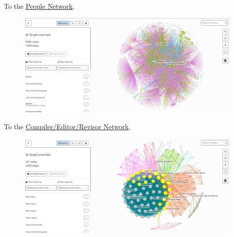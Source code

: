 \documentclass[12pt,a4paper,oneside]{book}
\begin{document}
\begin{sloppypar}
To the \href{https://ouestware.gitlab.io/retina/1.0.0-beta.1/#/graph/?url=https%3A%2F%2Fgist.githubusercontent.com%2Fdodopianist%2F284997da5801f90b7767df40eef365b0%2Fraw%2Ff300443ab5160ab340f1472c63a4edd270ea1c05%2Fpeople_network.gexf&sa[]=ei&sa[]=be&sa[]=clo&sa[]=deg-n&sa[]=clu-n&ca[]=gn&ca[]=msr&ca[]=msl&ca[]=msp&ca[]=md-s&ca[]=bip&ca[]=bir&ca[]=deap&ca[]=dear&ca[]=pri&ca[]=hoo&ca[]=clo&ca[]=be&ca[]=deg-n&ca[]=clu-n&ec=o}{\underline{People Network}}.
\begin{figure}[H]
\centering
\includegraphics[scale=0.38]{graph/Retina-1.png}
\end{figure}

To the \href{https://ouestware.gitlab.io/retina/1.0.0-beta.1/#/graph/?url=https%3A%2F%2Fgist.githubusercontent.com%2Fdodopianist%2Feb21d80ea0e30d512a3c49d97f7e035a%2Fraw%2F993868d8a1aab1e07c3c7345e7b8dbb11b7c5edb%2Fcer_network.gexf&sa[]=ei&sa[]=be-n&sa[]=clo-n&sa[]=deg-n&ca[]=msr&ca[]=msl&ca[]=msp&ca[]=md-s&ca[]=pri&ca[]=hoo&ca[]=clu-n&ca[]=be-n&ca[]=clo-n&ca[]=deg-n&ca[]=bir&ca[]=dear&ca[]=deap&ca[]=ei&fa=bip&ec=o}{\underline{Compiler/Editor/Revisor Network}}.
\begin{figure}[H]
\centering
\includegraphics[scale=0.38]{graph/Retina-2.png}
\end{figure}


\end{sloppypar}
\end{document}

